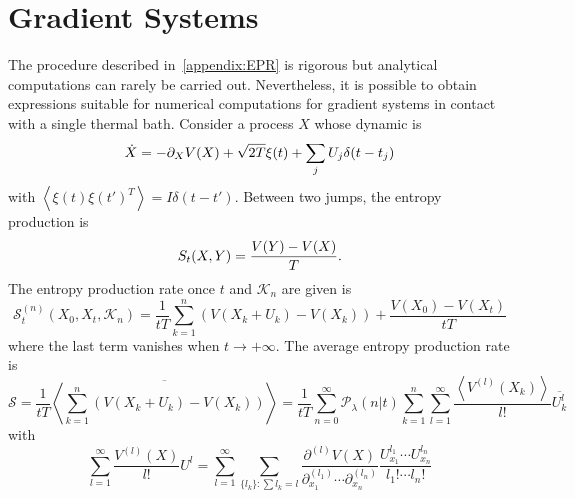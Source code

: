 \documentclass[12pt]{iopart}
\newcommand{\lx} {\left}
\newcommand{\rx} {\right}
\newcommand{\ave}[1] {\lx\langle #1 \rx\rangle}
\newcommand{\cP} {\mathcal{P}}
\newcommand{\cS} {\mathcal{S}}
\newcommand{\cK} {\mathcal{K}}
\begin{document}
\section{Gradient Systems}%
The procedure described in~\ref{appendix:EPR} is rigorous but analytical computations can rarely be carried out. Nevertheless, it is possible to obtain expressions suitable for numerical computations for gradient systems in contact with a single thermal bath. Consider a process $X$ whose dynamic is 
\begin{equation}
    \dot{X} = -\partial_X V(X) + \sqrt{2T}\xi(t) +\sum_j U_j \delta(t-t_j)\\
\end{equation}
with $\ave{\xi(t)\xi(t')^T}=I\delta(t-t')$. Between two jumps, the entropy production is 
\begin{equation}
    S_t(X,Y) = \frac{V(Y) -V(X)}{T}.\\
\end{equation}
The entropy production rate once $t$ and $\cK_n$ are given is 
\begin{equation}
\cS^{(n)}_t(X_0,X_t,\cK_n)=  \frac{1}{tT}\sum_{k=1}^n \lx(V(X_k+U_k)-V(X_k)\rx)+\frac{V(X_0) -V(X_t)}{tT}
\end{equation}
where the last term vanishes when $t\to+\infty$.
The average entropy production rate is
\begin{equation}
\cS = \frac{1}{tT}\overline{\ave{\sum_{k=1}^n \lx(V(X_k+U_k)-V(X_k)\rx)}} = \frac{1}{tT} \sum_{n=0}^\infty \cP_\lambda(n|t) \sum_{k=1}^n \sum_{l=1}^\infty \frac{\ave{V^{(l)}(X_k)}}{l!}\overline{U_k^{l}}
\end{equation}
with
\begin{equation}
\sum_{l=1}^\infty \frac{V^{(l)}(X)}{l!}U^{l}=\sum_{l=1}^{\infty}\sum_{\{l_k\}:\sum l_k =l}\frac{\partial^{(l)}V(X)}{\partial_{x_1}^{(l_1)}\cdots\partial_{x_n}^{(l_n)}}\frac{U_{x_1}^{l_1}\cdots U_{x_n}^{l_n}}{l_1!\cdots l_n!}
\end{equation}
\end{document}
